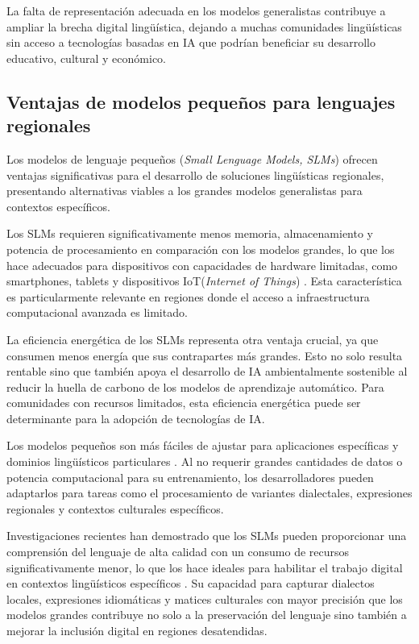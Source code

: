 \documentclass[10pt,twoside]{rcmart} %
\begin{document}
La falta de representación adecuada en los modelos generalistas contribuye a ampliar la brecha digital lingüística, dejando a muchas comunidades lingüísticas sin acceso a tecnologías basadas en IA que podrían beneficiar su desarrollo educativo, cultural y económico.

\subsection{Ventajas de modelos pequeños para lenguajes regionales}

Los modelos de lenguaje pequeños (\textit{Small Lenguage Models, SLMs}) ofrecen ventajas significativas para el desarrollo de soluciones lingüísticas regionales, presentando alternativas viables a los grandes modelos generalistas para contextos específicos.

Los SLMs requieren significativamente menos memoria, almacenamiento y potencia de procesamiento en comparación con los modelos grandes, lo que los hace adecuados para dispositivos con capacidades de hardware limitadas, como smartphones, tablets y dispositivos IoT(\textit{Internet of Things}) \cite{tonja2024inkubalm}. Esta característica es particularmente relevante en regiones donde el acceso a infraestructura computacional avanzada es limitado.

La eficiencia energética de los SLMs representa otra ventaja crucial, ya que consumen menos energía que sus contrapartes más grandes. Esto no solo resulta rentable sino que también apoya el desarrollo de IA ambientalmente sostenible al reducir la huella de carbono de los modelos de aprendizaje automático. Para comunidades con recursos limitados, esta eficiencia energética puede ser determinante para la adopción de tecnologías de IA.

Los modelos pequeños son más fáciles de ajustar para aplicaciones específicas y dominios lingüísticos particulares \cite{hu2024fox}. Al no requerir grandes cantidades de datos o potencia computacional para su entrenamiento, los desarrolladores pueden adaptarlos para tareas como el procesamiento de variantes dialectales, expresiones regionales y contextos culturales específicos.

Investigaciones recientes han demostrado que los SLMs pueden proporcionar una comprensión del lenguaje de alta calidad con un consumo de recursos significativamente menor, lo que los hace ideales para habilitar el trabajo digital en contextos lingüísticos específicos \cite{dong2411hymba}. Su capacidad para capturar dialectos locales, expresiones idiomáticas y matices culturales con mayor precisión que los modelos grandes contribuye no solo a la preservación del lenguaje sino también a mejorar la inclusión digital en regiones desatendidas.
\end{document}
